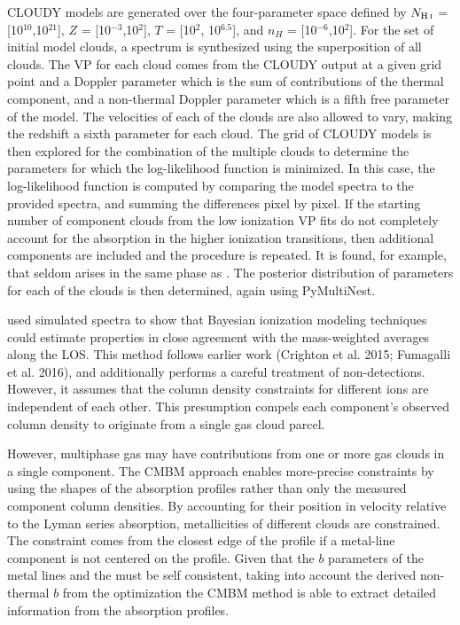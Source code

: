 \documentclass[fleqn,usenatbib]{mnras}
\begin{document}
CLOUDY models are generated over the four-parameter space defined by $N_{\ion{H}{I}}$ = [10$^{10}$,10$^{21}$], $Z$ = [10$^{-3}$,10$^{2}$], $T$ = [10$^{2}$, 10$^{6.5}$], and $n_H$ = [10$^{-6}$,10$^{2}$].
For the set of initial model clouds, a spectrum is synthesized using the superposition of all clouds.
The VP for each cloud comes from the CLOUDY output at a given grid point and a Doppler parameter which is the sum of contributions of the thermal component, and a non-thermal Doppler parameter which is a fifth free parameter of the model.
The velocities of each of the clouds are also allowed to vary, making the redshift a sixth parameter for each cloud.
The grid of CLOUDY models is then explored for the combination of the multiple clouds to determine the parameters for which the log-likelihood function is minimized.
In this case, the log-likelihood function is computed by comparing the model spectra to the provided spectra, and summing the differences pixel by pixel.
If the starting number of component clouds from the low ionization VP fits do not completely account for the absorption in the higher ionization transitions, then additional components are included and the procedure is repeated.
It is found, for example, that  seldom arises in the same phase as .
The posterior distribution of parameters for each of the clouds is then determined, again using PyMultiNest.

\cite{liang2018Observing} used simulated spectra to show that Bayesian ionization modeling techniques could estimate properties in close agreement with the  mass-weighted averages along the LOS.
This method follows earlier work (Crighton et al. 2015; Fumagalli et al. 2016), and additionally performs a careful treatment of non-detections.
However, it assumes that the column density constraints for different ions are independent of each other.
This presumption compels each component's observed column density to originate from a single gas cloud parcel.

However, multiphase gas may have contributions from one or more gas clouds in a single component.
The CMBM approach enables more-precise constraints by using the shapes of the absorption profiles rather than only the measured component column densities.
By accounting for their position in velocity relative to the Lyman series absorption, metallicities of different clouds are constrained.
The constraint comes from the closest edge of the  profile if a metal-line component is not centered on the  profile.
Given that the $b$ parameters of the metal lines and the  must be self consistent, taking into account the derived non-thermal $b$ from the optimization the CMBM method is able to extract detailed information from the absorption profiles.
\end{document}
